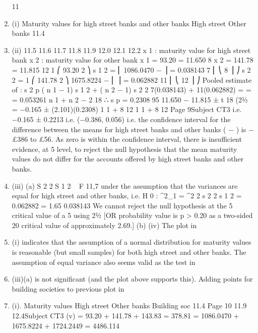 \documentclass[a4paper,12pt]{article}
\begin{document}
\begin{enumerate}
11
\item (i)
Maturity values for high street banks and other banks
High street
Other banks
11.4
\item (ii)
11.5
11.6
11.7
11.8
11.9
12.0
12.1
12.2
x 1 : maturity value for high street bank
x 2 : maturity value for other bank
x 1 = 93.20
= 11.650
8
x 2 = 141.78
= 11.815
12
1 ⎛
93.20 2 ⎞
s 1 2 = ⎜ 1086.0470 −
⎟ = 0.038143
7 ⎜ ⎝
8 ⎟ ⎠
s 2 2 =
1 ⎛
141.78 2 ⎞
1675.8224
−
⎜
⎟ = 0.062882
11 ⎜ ⎝
12 ⎟ ⎠
Pooled estimate of \sigma:
s 2 p
( n 1 − 1) s 1 2 + ( n 2 − 1) s 2 2 7(0.038143) + 11(0.062882)
=
=
= 0.053261
n 1 + n 2 − 2
18
∴ s p = 0.2308
95%
11.650 − 11.815 ± t 18 (21⁄2%
= −0.165 ± (2.101)(0.2308)
1 1
+
8 12
1 1
+
8 12
Page 9Subject CT3 %
i.e. −0.165 ± 0.2213
i.e. (−0.386, 0.056)
i.e. the confidence interval for the difference between the means for high street
banks and other banks ( −  ) is −£386 to £56.
As zero is within the confidence interval, there is insufficient evidence, at 5%
level, to reject the null hypothesis that the mean maturity values do not differ
for the accounts offered by high street banks and other banks.
\item (iii)
(a)
S 2 2
S 1 2
~ F 11,7
under the assumption that the variances are equal for high street and
other banks,
i.e. H 0 : \sigma^2_1 = \sigma^2 2
s 2 2
s 1 2
=
0.062882
= 1.65
0.038143
We cannot reject the null hypothesis at the 5%
critical value of a 5%
using 21⁄2%
[OR probability value is p > 0.20 as a two-sided 20%
critical value of approximately 2.69.]
(b)
(iv)
The plot in \item (i) indicates that the assumption of a normal distribution for
maturity values is reasonable (but small samples) for both high street
and other banks. The assumption of equal variance also seems valid as
the test in \item (iii)(a) is not significant (and the plot above supports this).
Adding points for building societies to previous plot in \item (i).
Maturity values
High street
Other banks
Building soc
11.4
Page 10
11.9
12.4Subject CT3 %
(v)
\sigmax = 93.20 + 141.78 + 143.83 = 378.81
 = 1086.0470 + 1675.8224 + 1724.2449 = 4486.114

\end{enumerate}
\end{document}
